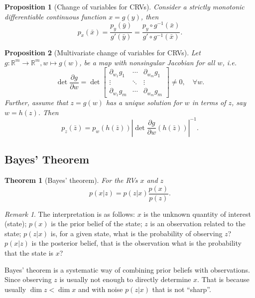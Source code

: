 \documentclass[]{hsrzf}
\theoremstyle{plain}
\newtheorem{thm}{Theorem}[section]
\newtheorem{prop}{Proposition}[section]
\theoremstyle{definition}
\theoremstyle{remark}
\newtheorem*{remark}{Remark}
\begin{document}
\begin{prop}[Change of variables for CRVs]
  Consider a strictly monotonic differentiable continuous function $x = g(y)$,
  then
  \[
    p_x(\bar{x}) = \frac{p_y(\bar{y})}{g'(\bar{y})}
      = \frac{p_y \circ g^{-1}(\bar{x})}{g' \circ g^{-1} (\bar{x})}.
  \]
\end{prop}

\begin{prop}[Multivariate change of variables for CRVs]
  \label{pro:multivariate-change-var}
  Let $g : \mathbb{R}^m \to \mathbb{R}^m, w \mapsto g(w)$, be a map with
  nonsingular Jacobian for all $w$, i.e.
  \[
    \det \frac{\partial g}{\partial w} = \det \begin{bmatrix}
      \partial_{w_1} g_1 & \cdots & \partial_{w_m} g_1 \\
      \vdots & \ddots & \vdots \\
      \partial_{w_1} g_m & \cdots & \partial_{w_m} g_m
    \end{bmatrix}
    \neq 0, \quad \forall w.
  \]
  Further, assume that $z = g(w)$ has a unique solution for $w$ in terms of
  $z$, say $w = h(z)$. Then
  \[
    p_z(\bar{z}) = p_w(h(\bar{z})) \left|
      \det \frac{\partial g}{\partial w}(h(\bar{z})) \right|^{-1}.
  \]
\end{prop}

\subsection{Bayes' Theorem}

\begin{thm}[Bayes' theorem] For the RVs $x$ and $z$
\[
  p(x|z) = p(z|x)\frac{p(x)}{p(z)}.
\]
\end{thm}

\begin{remark}
  The interpretation is as follows: $x$ is the unknown quantity of interest
  (state); $p(x)$ is the prior belief of the state; $z$ is an observation
  related to the state; $p(z|x)$ is, for a given state, what is the
  probability of observing $z$? $p(x|z)$ is the posterior belief, that is the
  observation what is the probability that the state is $x$?
\end{remark}

Bayes' theorem is a systematic way of combining prior beliefs with
observations. Since observing $z$ is usually not enough to directly determine
$x$. That is because usually $\dim z < \dim x$ and with noise $p(z|x)$ that is not
``sharp''.
\end{document}
